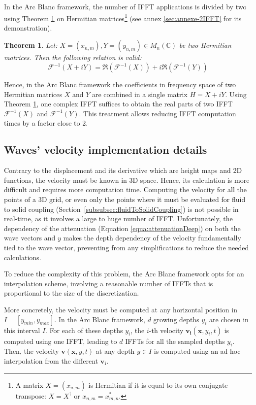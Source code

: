 \documentclass[final]{jcgt}
\newtheorem{theorem}{Theorem}
\def\framework{the Arc Blanc framework\xspace}
\begin{document}
In \framework, the number of IFFT applications is divided by two using Theorem \ref{theorem:ifft} on Hermitian matrices\footnote{A matrix $X=(x_{n,m})$ is Hermitian if it is equal to its own conjugate transpose: $X = X^{\dagger}$ or $x_{n,m}=x^*_{m,n}$.} (see annex \ref{sec:annexe-2IFFT} for its demonstration).
\begin{theorem}
	\label{theorem:ifft}
	Let: $X=(x_{n,m}), Y=(y_{n,m}) \in M_n(\mathbb{C})$ be two Hermitian matrices.
	Then the following relation is valid:
	\begin{equation}
		\mathcal{F}^{-1}\left(X+iY\right) =
		\Re\left(\mathcal{F}^{-1}\left(X\right)\right)
		+ i\Re\left(\mathcal{F}^{-1}\left(Y\right)\right)
	\end{equation}
\end{theorem}
Hence, in \framework the coefficients in frequency space of two Hermitian matrices $X$ and $Y$ are combined in a single matrix $H=X+iY$.
Using Theorem \ref{theorem:ifft}, one complex IFFT suffices to obtain the real parts of two IFFT $\mathcal{F}^{-1}\left(X\right)$ and $\mathcal{F}^{-1}\left(Y\right)$.
This treatment allows reducing IFFT computation times by a factor close to 2.

\subsection{Waves' velocity implementation details}
Contrary to the displacement and its derivative which are height maps and 2D functions, the velocity must be known in 3D space.
Hence, its calculation is more difficult and requires more computation time.
Computing the velocity for all the points of a 3D grid, or even only the points where it must be evaluated for fluid to solid coupling (Section~\ref{subsubsec:fluidToSolidCoupling}) is not possible in real-time, as it involves a large to huge number of IFFT.
Unfortunately, the dependency of the attenuation (Equation \ref{equa:attenuationDeep}) on both the wave vectors and $y$ makes the depth dependency of the velocity fundamentally tied to the wave vector, preventing from any simplifications to reduce the needed calculations.

To reduce the complexity of this problem, \framework opts for an interpolation scheme, involving a reasonable number of IFFTs that is proportional to the size of the discretization.

More concretely, the velocity must be computed at any horizontal position in $I=[y_{min}, y_{max}]$.
In \framework, $d$ growing depths $y_i$ are chosen in this interval $I$.
For each of these depths $y_i$, the $i$-th velocity $\mathbf{v_i}(\mathbf x,y_i,t)$ is computed using one IFFT, leading to $d$ IFFTs for all the sampled depths $y_i$.
Then, the velocity $\mathbf{v}(\mathbf x,y,t)$ at any depth $y\in I$ is computed using an ad hoc interpolation from the different $\mathbf{v_i}$.
\end{document}
